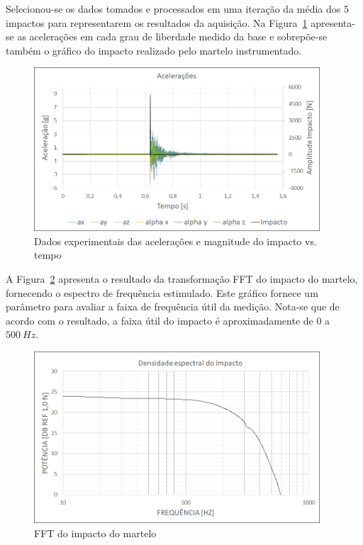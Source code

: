 Selecionou-se os dados tomados e processados em uma iteração da média
dos 5 impactos para representarem os resultados da aquisição. Na
Figura~\ref{fig::aceleracoes} apresenta-se as acelerações em cada grau de
liberdade medido da base e sobrepõe-se também o gráfico do impacto realizado
pelo martelo instrumentado.

\begin{figure}[h]
	\centering 
 	\includegraphics[width=0.95\textwidth]{figs/aceleracoes}
 	\caption{Dados experimentais das acelerações e magnitude do impacto vs. tempo
 	}
 	\label{fig::aceleracoes}
\end{figure}

A Figura~\ref{fig::martelo_spectrum} apresenta o resultado da transformação FFT
do impacto do martelo, fornecendo o espectro de frequência estimulado. Este
gráfico fornece um parâmetro para avaliar a faixa de frequência útil da medição.
Nota-se que de acordo com o resultado, a faixa útil do impacto é aproximadamente
de $0$ a $500~Hz$.

\begin{figure}[h!]
	\centering 
 	\includegraphics[width=0.95\textwidth]{figs/martelo_spectrum}
 	\caption{FFT do impacto do martelo}
 	\label{fig::martelo_spectrum}
\end{figure}

